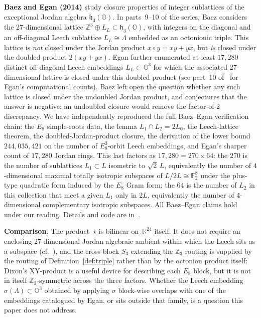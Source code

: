 \documentclass[twoside,english]{paper}
\numberwithin{equation}{section}
\numberwithin{figure}{section}
\theoremstyle{definition}
\theoremstyle{remark}
\newcommand{\OO}{\mathbb{O}}          %
\newcommand{\RR}{\mathbb{R}}
\newcommand{\ZZ}{\mathbb{Z}}
\newcommand{\FF}{\mathbb{F}}
\newcommand{\LL}{\Lambda}             %
\begin{document}
\textbf{Baez and Egan (2014)} \cite{Baez2014} study closure
properties of integer sublattices of the exceptional Jordan algebra
$\mathfrak{h}_3(\OO)$.  In parts~9--10 of the series, Baez considers
the 27-dimensional lattice $\ZZ^3 \oplus L_L \subset \mathfrak{h}_3(\OO)$,
with integers on the diagonal and an off-diagonal Leech sublattice
$L_L \cong \LL$ embedded as an octonionic triple.  This lattice is
\emph{not} closed under the Jordan product $x \circ y = xy + yx$,
but \emph{is} closed under the doubled product $2(xy + yx)$.
Egan further enumerated at least $17{,}280$ distinct off-diagonal
Leech embeddings $L_L \subset \OO^3$ for which the associated
27-dimensional lattice is closed under this doubled product
(see part~10 of~\cite{Baez2014} for Egan's computational counts).
Baez left open the question whether any such lattice is closed under
the undoubled Jordan product, and conjectures that the answer is
negative; an undoubled closure would remove the factor-of-2
discrepancy.  We
have independently reproduced the full Baez--Egan verification chain:
the $E_8$ simple-roots data, the lemma $L_1 \cap L_2 = 2L_0$, the
Leech-lattice theorem, the doubled-Jordan-product closure, the
derivation of the lower bound $244{,}035{,}421$ on the number of
$E_8^3$-orbit Leech embeddings, and Egan's sharper count of
$17{,}280$ Jordan rings.  This last factors as $17{,}280 = 270
\times 64$: the $270$ is the number of sublattices $L_1 \subset L$
isometric to $\sqrt{2}\,L$, equivalently the number of $4$-dimensional
maximal totally isotropic subspaces of $L/2L \cong \FF_2^8$ under the
plus-type quadratic form induced by the $E_8$ Gram form; the $64$ is
the number of $L_2$ in this collection that meet a given $L_1$ only
in $2L$, equivalently the number of $4$-dimensional complementary
isotropic subspaces.  All Baez--Egan claims hold under our reading.
Details and code are in~\cite{repo}.

\textbf{Comparison.}  The product~$\star$ is bilinear on~$\RR^{24}$
itself.  It does not require an enclosing 27-dimensional
Jordan-algebraic ambient within which the Leech sits as a subspace
(cf.~\cite{Baez2014}), and the cross-block $S_3$ extending the
$\ZZ_3$ routing is supplied by the routing of
Definition~\ref{def:triple} rather than by the octonion product
itself: Dixon's XY-product
\cite{Dixon1995, Dixon2010} is a useful device for describing each
$E_8$ block, but it is not in itself $\ZZ_3$-symmetric across the
three factors.  Whether the Leech embedding $\sigma(\LL) \subset
\OO^3$ obtained by applying $\sigma$ block-wise overlaps with one of
the embeddings catalogued by Egan, or sits outside that family, is
a question this paper does not address.
\end{document}
